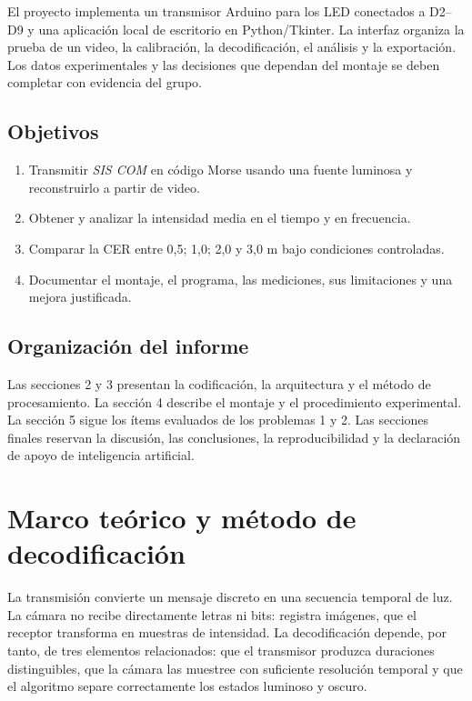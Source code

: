 \documentclass[11pt,a4paper]{article}
\begin{document}
El proyecto implementa un transmisor Arduino para los LED conectados a D2--D9 y una aplicación local de escritorio en Python/Tkinter. La interfaz organiza la prueba de un video, la calibración, la decodificación, el análisis y la exportación. Los datos experimentales y las decisiones que dependan del montaje se deben completar con evidencia del grupo.

\subsection{Objetivos}
\begin{enumerate}
    \item Transmitir \textit{SIS COM} en código Morse usando una fuente luminosa y reconstruirlo a partir de video.
    \item Obtener y analizar la intensidad media en el tiempo y en frecuencia.
    \item Comparar la CER entre 0,5; 1,0; 2,0 y 3,0 m bajo condiciones controladas.
    \item Documentar el montaje, el programa, las mediciones, sus limitaciones y una mejora justificada.
\end{enumerate}

\subsection{Organización del informe}
Las secciones 2 y 3 presentan la codificación, la arquitectura y el método de procesamiento. La sección 4 describe el montaje y el procedimiento experimental. La sección 5 sigue los ítems evaluados de los problemas 1 y 2. Las secciones finales reservan la discusión, las conclusiones, la reproducibilidad y la declaración de apoyo de inteligencia artificial.

\section{Marco teórico y método de decodificación}
La transmisión convierte un mensaje discreto en una secuencia temporal de luz. La cámara no recibe directamente letras ni bits: registra imágenes, que el receptor transforma en muestras de intensidad. La decodificación depende, por tanto, de tres elementos relacionados: que el transmisor produzca duraciones distinguibles, que la cámara las muestree con suficiente resolución temporal y que el algoritmo separe correctamente los estados luminoso y oscuro.
\end{document}
